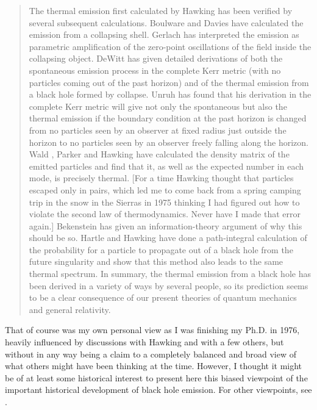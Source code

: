 \documentclass[12pt]{article} \usepackage{latexsym} \textwidth 15cm
\begin{document}
\begin{quotation}
The thermal emission first calculated by Hawking has been verified by
several subsequent calculations.  Boulware \cite{Boul} and Davies
\cite{Dav} have calculated the emission from a collapsing shell.
Gerlach \cite{Ger} has interpreted the emission as parametric
amplification of the zero-point oscillations of the field inside the
collapsing object.  DeWitt \cite{DeW} has given detailed derivations
of both the spontaneous emission process in the complete Kerr metric
(with no particles coming out of the past horizon) and of the thermal
emission from a black hole formed by collapse.  Unruh \cite{Unruh75}
has found that his derivation in the complete Kerr metric will give
not only the spontaneous but also the thermal emission if the boundary
condition at the past horizon is changed from no particles seen by an
observer at fixed radius just outside the horizon to no particles seen
by an observer freely falling along the horizon.  Wald \cite{Wald75},
Parker \cite{Park} and Hawking \cite{Haw3} have calculated the density
matrix of the emitted particles and find that it, as well as the
expected number in each mode, is precisely thermal.  [For a time
Hawking thought that particles escaped only in pairs, which led me to
come back from a spring camping trip in the snow in the Sierras in
1975 thinking I had figured out how to violate the second law of
thermodynamics.  Never have I made that error again.]  Bekenstein
\cite{Bek5a} has given an information-theory argument of why this
should be so.  Hartle and Hawking \cite{HH} have done a path-integral
calculation of the probability for a particle to propagate out of a
black hole from the future singularity and show that this method also
leads to the same thermal spectrum.  In summary, the thermal emission
from a black hole has been derived in a variety of ways by several
people, so its prediction seems to be a clear consequence of our
present theories of quantum mechanics and general relativity.

\end{quotation}

That of course was my own personal view as I was finishing my Ph.D. in
1976, heavily influenced by discussions with Hawking and with a few
others, but without in any way being a claim to a completely balanced
and broad view of what others might have been thinking at the time.
However, I thought it might be of at least some historical interest to
present here this biased viewpoint of the important historical
development of black hole emission.  For other viewpoints, see
\cite{Hawreview,Bekreview,Wheeler}.
\end{document}
